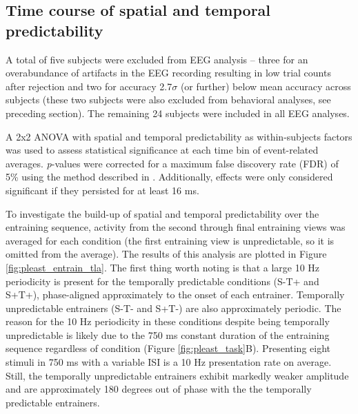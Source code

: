 \documentclass[dwyatte_dissertation.tex]{subfiles}
\begin{document}
\subsection{Time course of spatial and temporal predictability}
A total of five subjects were excluded from EEG analysis -- three for an overabundance of artifacts in the EEG recording resulting in low trial counts after rejection and two for accuracy 2.7$\sigma$ (or further) below mean accuracy across subjects (these two subjects were also excluded from behavioral analyses, see preceding section). The remaining 24 subjects were included in all EEG analyses. 

A 2x2 ANOVA with spatial and temporal predictability as within-subjects factors was used to assess statistical significance at each time bin of event-related averages. \textit{p}-values were corrected for a maximum false discovery rate (FDR) of 5\% using the method described in . Additionally, effects were only considered significant if they persisted for at least 16 ms.

To investigate the build-up of spatial and temporal predictability over the entraining sequence, activity from the second through final entraining views was averaged for each condition (the first entraining view is unpredictable, so it is omitted from the average). The results of this analysis are plotted in Figure \ref{fig:pleast_entrain_tla}. The first thing worth noting is that a large 10 Hz periodicity is present for the temporally predictable conditions (S-T+ and S+T+), phase-aligned approximately to the onset of each entrainer. Temporally unpredictable entrainers (S-T- and S+T-) are also approximately periodic. The reason for the 10 Hz periodicity in these conditions despite being temporally unpredictable is likely due to the 750 ms constant duration of the entraining sequence regardless of condition (Figure \ref{fig:pleast_task}B). Presenting eight stimuli in 750 ms with a variable ISI is a 10 Hz presentation rate on average. Still, the temporally unpredictable entrainers exhibit markedly weaker amplitude and are approximately 180 degrees out of phase with the the temporally predictable entrainers.
\end{document}
